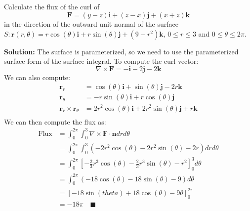 \documentclass[letterpaper, 11pt]{article}
\begin{document}
\subsection{} Calculate the flux of the curl of 
\[ \bm{F} = (y-z)\bm{i} + (z - x)\bm{j} + (x + z) \bm{k} \]
in the direction of the outward unit normal of the surface $S : \bm{r}(r,\theta) = r \cos(\theta) \bm{i} + r \sin(\theta) \bm{j} + (9 - r^2) \bm{k}$, $ 0 \leq r \leq 3$ and $ 0 \leq \theta \leq 2 \pi$. 
\par \textbf{Solution:} The surface is parameterized, so we need to use the parameterized surface form of the surface integral. To compute the curl vector:
\[ \nabla \times \bm{F} = - \bm{i} -2 \bm{j} -2 \bm{k} \]
We can also compute:
\begin{align*}
\bm{r}_r &= \cos (\theta) \bm{i} + \sin (\theta) \bm{j} -2r \bm{k} \\
\bm{r}_\theta &= -r \sin(\theta) \bm{i} + r \cos (\theta) \bm{j} \\
\bm{r}_r \times \bm{r}_\theta &= 2r^2 \cos(\theta) \bm{i} + 2r^2 \sin(\theta) \bm{j} + r \bm{k} \\
\end{align*}
We can then compute the flux as:
\begin{align*}
\text{Flux} &= \int_0^{2 \pi} \int_0^3 \nabla \times \bm{F} \cdot \bm{n} dr d \theta \\
&= \int_0^{2 \pi} \int_0^3 (-2r^2 \cos(\theta) - 2 r^2 \sin(\theta) - 2r )dr d\theta \\
&= \int_0^{2 \pi} \left[-\frac{2}{3} r^3\cos(\theta) - \frac{2}{3} r^3 \sin(\theta) - r^2   \right]_0^3 d\theta \\
&= \int_0^{2\pi}(-18\cos(\theta) - 18\sin(\theta) - 9 ) d\theta \\
&= \left[-18\sin(theta) + 18 \cos(\theta) - 9 \theta  \right]_0^{2\pi} \\
&= -18 \pi \quad\blacksquare 
\end{align*}
\end{document}
